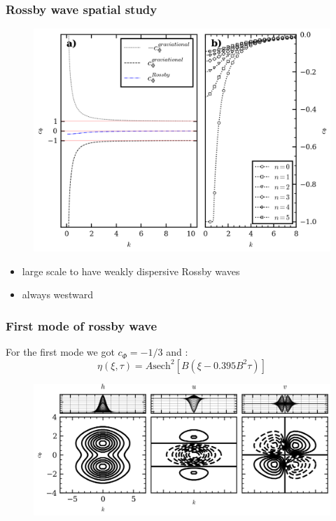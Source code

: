 \documentclass[numbering=fraction]{beamer}
\begin{document}
\begin{frame}
    \frametitle{Rossby wave spatial study}
    \begin{minipage}{.7\linewidth}
        \begin{figure}[H]
            \includegraphics[width=1\linewidth]{./figure/roots_k.png}
            \label{fig:}
        \end{figure}
    \end{minipage}
    \hfill
    \begin{minipage}{.28\linewidth}
        \begin{itemize}
            \item large scale to have weakly dispersive Rossby waves
            \item always westward
        \end{itemize}
    \end{minipage}
\end{frame}

\begin{frame}
    \frametitle{First mode of rossby wave}
    For the first mode we got $c_\Phi = -1/3$ and :
    \begin{equation}
        \label{eq:8}
        \eta(\xi, \tau) = A \text{sech}^2[B(\xi - 0.395B^2\tau)]
    \end{equation}
    \begin{figure}[H]
        \hspace*{-.5cm}\includegraphics[width=1\linewidth]{./figure/initial_data.png}
    \end{figure}
\end{frame}
\end{document}
